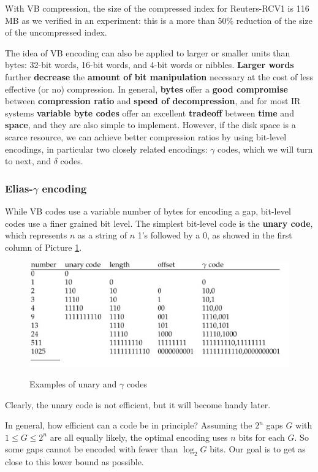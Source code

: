 With VB compression, the size of the compressed index for Reuters-RCV1 is 116 MB as we verified in an experiment: this is a more than 50\% reduction of the size of the uncompressed index. 

The idea of VB encoding can also be applied to larger or smaller units than bytes: 32-bit words, 16-bit words, and 4-bit words or nibbles. \textbf{Larger words} further \textbf{decrease} the \textbf{amount of bit manipulation} necessary at the cost of less effective (or no) compression. In general, \textbf{bytes} offer a \textbf{good compromise} between \textbf{compression ratio} and \textbf{speed of decompression}, and for most IR systems \textbf{variable byte codes} offer an excellent \textbf{tradeoff} between \textbf{time} and \textbf{space}, and they are also simple to implement. However, if the disk space is a scarce resource, we can achieve better compression ratios by using bit-level encodings, in particular two closely related encodings: $\gamma$ codes, which we will turn to next, and $\delta$ codes.

\subsubsection{Elias-$\gamma$ encoding}
While VB codes use a variable number of bytes for encoding a gap, bit-level codes use a finer grained bit level. The simplest bit-level code is the \textbf{unary code}, which represents $n$ as a string of $n$ 1's followed by a 0, as showed in the first column of Picture \ref{gamma}.

\begin{figure}[h!]
		\centering
		\includegraphics[scale = 2.0]{img/gamma encoding.jpg}
		\label{gamma}
        \caption{Examples of unary and $\gamma$ codes}
\end{figure}

Clearly, the unary code is not efficient, but it will become handy later.

In general, how efficient can a code be in principle? Assuming the $2^n$ gaps $G$ with $1 \leq G \leq 2^n$ are all equally likely, the optimal encoding uses $n$ bits for each $G$. So some gaps cannot be encoded with fewer than $\log_2 G$ bits. Our goal is to get as close to this lower bound as possible.

